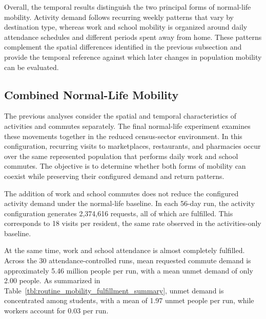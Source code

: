 Overall, the temporal results distinguish the two principal forms of normal-life mobility. Activity demand follows recurring weekly patterns that vary by destination type, whereas work and school mobility is organized around daily attendance schedules and different periods spent away from home. These patterns complement the spatial differences identified in the previous subsection and provide the temporal reference against which later changes in population mobility can be evaluated.



\subsection{Combined Normal-Life Mobility}
\label{sec:routine_mobility_combined}

The previous analyses consider the spatial and temporal characteristics of activities and commutes separately. The final normal-life experiment examines these movements together in the reduced census-sector environment. In this configuration, recurring visits to marketplaces, restaurants, and pharmacies occur over the same represented population that performs daily work and school commutes. The objective is to determine whether both forms of mobility can coexist while preserving their configured demand and return patterns.

The addition of work and school commutes does not reduce the configured activity demand under the normal-life baseline. In each 56-day run, the activity configuration generates 2,374,616 requests, all of which are fulfilled. This corresponds to 18 visits per resident, the same rate observed in the activities-only baseline.

At the same time, work and school attendance is almost completely fulfilled. Across the 30 attendance-controlled runs, mean requested commute demand is approximately 5.46 million people per run, with a mean unmet demand of only 2.00 people. As summarized in Table~\ref{tbl:routine_mobility_fulfillment_summary}, unmet demand is concentrated among students, with a mean of 1.97 unmet people per run, while workers account for 0.03 per run.

